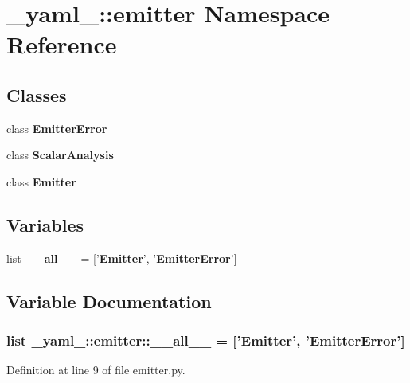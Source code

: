 \section{\_\-yaml\_\-::emitter Namespace Reference}
\label{namespace__yaml___1_1emitter}


\subsection*{Classes}
\begin{CompactItemize}
\item 
class {\bf EmitterError}
\item 
class {\bf ScalarAnalysis}
\item 
class {\bf Emitter}
\end{CompactItemize}
\subsection*{Variables}
\begin{CompactItemize}
\item 
list {\bf \_\-\_\-all\_\-\_\-} = ['{\bf Emitter}', '{\bf EmitterError}']
\end{CompactItemize}


\subsection{Variable Documentation}
\subsubsection{\setlength{\rightskip}{0pt plus 5cm}list {\bf \_\-yaml\_\-::emitter::\_\-\_\-all\_\-\_\-} = ['{\bf Emitter}', '{\bf EmitterError}']\hspace{0.3cm}{\tt  [static]}}\label{namespace__yaml___1_1emitter_93bc8439469c1c71bcbfa1e58e33e879}




Definition at line 9 of file emitter.py.